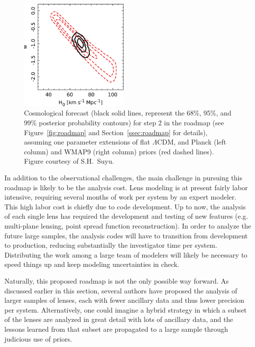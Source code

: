 \begin{figure}
\begin{center}
\includegraphics[height=5.5cm,clip]{figures/wmap9_wcdm_c22lenses_stats.jpg}
\end{center}
\caption{Cosmological forecast (black solid lines, represent the 68\%,
95\%, and 99\% posterior probability contours) for step 2 in the roadmap
(see Figure~\ref{fig:roadmap} and Section~\ref{ssec:roadmap} for
details), assuming one parameter extensions of flat $\Lambda$CDM, and
Planck (left column) and WMAP9 (right column) priors (red dashed lines).
Figure courtesy of S.H.~Suyu.}
\label{fig:roadmap-step2}
\end{figure}

In addition to the observational challenges, the main challenge in
pursuing this roadmap is likely to be the analysis cost. Lens modeling
is at present fairly labor intensive, requiring several months of work
per system by an expert modeler. This high labor cost is chiefly due
to code development. Up to now, the analysis of each single lens has
required the development and testing of new features (e.g. multi-plane
lensing, point spread function reconstruction). In order to analyze
the future large samples, the analysis codes will have to transition
from development to production, reducing substantially the
investigator time per system. Distributing the work among a large team
of modelers will likely be necessary to speed things up and keep
modeling uncertainties in check.

Naturally, this proposed roadmap is not the only possible way
forward. As discussed earlier in this section, several authors have
proposed the analysis of larger samples of lenses, each with fewer
ancillary data and thus lower precision per system. Alternatively, one
could imagine a hybrid strategy in which a subset of the lenses are
analyzed in great detail with lots of ancillary data, and the lessons
learned from that subset are propagated to a large sample through
judicious use of priors.
